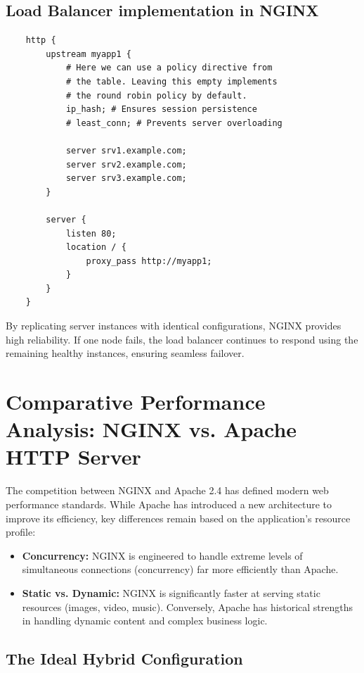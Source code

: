 \documentclass{scrbook}
\begin{document}
	\section{Load Balancer implementation in NGINX}
	
	\begin{lstlisting}
	http {
	    upstream myapp1 {
	        # Here we can use a policy directive from
	        # the table. Leaving this empty implements
	        # the round robin policy by default.
	        ip_hash; # Ensures session persistence
	        # least_conn; # Prevents server overloading
	        
	        server srv1.example.com;
	        server srv2.example.com;
	        server srv3.example.com;
	    }
	
	    server {
	        listen 80;
	        location / {
	            proxy_pass http://myapp1;
	        }
	    }
	}
	\end{lstlisting}
	
	By replicating server instances with identical configurations, NGINX provides high reliability. If one node fails, the load balancer continues to respond using the remaining healthy instances, ensuring seamless failover.
	
	\chapter{Comparative Performance Analysis: NGINX vs. Apache HTTP Server}
	
	The competition between NGINX and Apache 2.4 has defined modern web performance standards. While Apache has introduced a new architecture to improve its efficiency, key differences remain based on the application's resource profile:
	
	\begin{itemize}
	    \item \textbf{Concurrency:} NGINX is engineered to handle extreme levels of simultaneous connections (concurrency) far more efficiently than Apache.
	    \item \textbf{Static vs. Dynamic:} NGINX is significantly faster at serving static resources (images, video, music). Conversely, Apache has historical strengths in handling dynamic content and complex business logic.
	\end{itemize}
	
	\section{The Ideal Hybrid Configuration}
	
\end{document}
